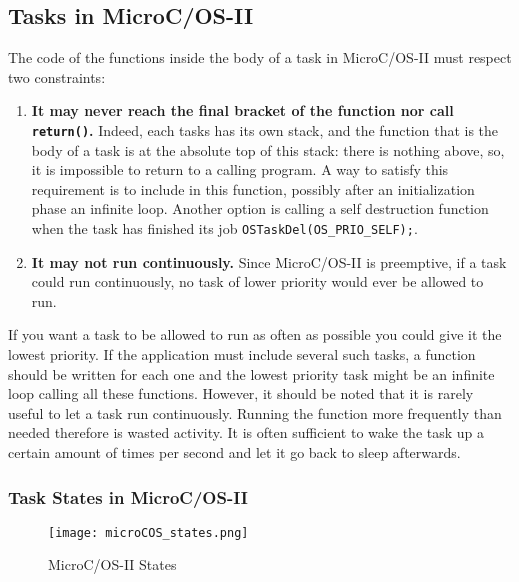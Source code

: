 \documentclass[../main.tex]{subfiles}
\begin{document}
\subsection{Tasks in MicroC/OS-II}
The code of the functions inside the body of a task in MicroC/OS-II must respect two constraints:
\begin{enumerate}
	\item \textbf{It may never reach the final bracket of the function nor call \lstinline{return()}.} Indeed, each tasks has its own stack, and the function that is the body of a task is at the absolute top of this stack: there is nothing above, so, it is impossible to return to a calling program. A way to satisfy this requirement is to include in this function, possibly after an initialization phase an infinite loop. Another option is calling a self destruction function when the task has finished its job \texttt{OSTaskDel(OS\_PRIO\_SELF);}.
	\item \textbf{It may not run continuously.} Since  MicroC/OS-II is preemptive, if a task could run continuously, no task of lower priority would ever be allowed to run.
\end{enumerate}
If you want a task to be allowed to run as often as possible you could give it the lowest priority.
If the application must include several such tasks, a function should be written for each one and the lowest priority task might be an infinite loop calling all these functions.
However, it should be noted that it is rarely useful to let a task run continuously.
Running the function more frequently than needed therefore is wasted activity.
It is often sufficient to wake the task up a certain amount of times per second and let it go back to sleep afterwards.

\subsubsection{Task States in MicroC/OS-II}
\begin{figure}[H]
    \centering
    \texttt{[image: microCOS\_states.png]}
    \caption{MicroC/OS-II States}
    \label{mcosii}
\end{figure}
\end{document}
